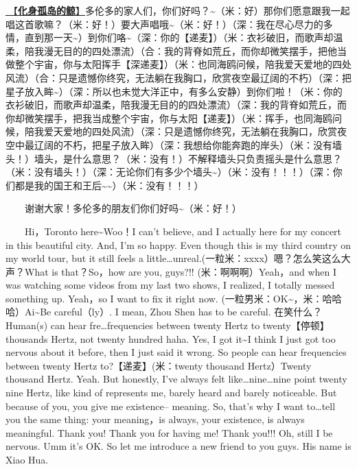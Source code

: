 \documentclass[]{ctexbook}
\begin{document}
\hyperref[hua-shen-gu-dao-de-jing]{🎵【\textbf{化身孤岛的鲸}】}多伦多的家人们，你们好吗？\textasciitilde（米：好）那你们愿意跟我一起唱这首歌嘛？（米：好！）要大声唱哦\textasciitilde（米：好！）（深：我在尽心尽力的多情，直到那一天\textasciitilde）到你们咯\textasciitilde（深：你的【递麦】）（米：衣衫破旧，而歌声却温柔，陪我漫无目的的四处漂流）（合：我的背脊如荒丘，而你却微笑摆手，把他当做整个宇宙，你与太阳挥手【深递麦】）（米：也同海鸥问候，陪我爱天爱地的四处风流）（合：只是遗憾你终究，无法躺在我胸口，欣赏夜空最辽阔的不朽）（深：把星子放入眸\textasciitilde）（深：所以也未觉大洋正中，有多么安静）到你们啦！（米：你的衣衫破旧，而歌声却温柔，陪我漫无目的的四处漂流）（深：我的背脊如荒丘，而你却微笑摆手，把我当成整个宇宙，你与太阳【递麦】）（米：挥手，也同海鸥问候，陪我爱天爱地的四处风流）（深：只是遗憾你终究，无法躺在我胸口，欣赏夜空中最辽阔的不朽，把星子放入眸）（深：我想给你能奔跑的岸头）（米：没有墙头！）墙头，是什么意思？（米：没有！）不解释墙头只负责摇头是什么意思？（米：没有墙头！）（深：无论你们有多少个墙头\textasciitilde）（米：没有！！！）（深：你们都是我的国王和王后\textasciitilde\textasciitilde）（米：没有！！！）

  谢谢大家！多伦多的朋友们你们好吗\textasciitilde（米：好！）

  Hi，Toronto here\textasciitilde Woo！I can't believe, and I actually here for my concert in this beautiful city. And, I'm so happy. Even though this is my third country on my world tour, but it still feels a little\ldots unreal.(一粒米：xxxx）嗯？怎么笑这么大声？What is that？So，how are you, guys?!! (米：啊啊啊）Yeah，and when I was watching
some videos from my last two shows, I realized, I totally messed something up. Yeah，so I want to fix it right now. (一粒男米：OK\textasciitilde，米：哈哈哈）Ai\textasciitilde Be careful（ly）. I mean, Zhou Shen has to be careful. 在笑什么？Human(s) can hear fre\ldots frequencies between twenty Hertz to twenty【停顿】thousands Hertz, not twenty hundred haha. Yes, I got it\textasciitilde I think I just got too nervous about it before, then I just said it wrong. So people can hear frequencies between twenty Hertz to?【递麦】(米：twenty thousand Hertz）Twenty thousand Hertz. Yeah. But honestly, I've always felt like\ldots nine\ldots nine point twenty nine Hertz, like kind of represents me, barely heard and barely noticeable. But because of you, you give me existence-- meaning. So, that's why I want to\ldots tell you the same thing: your meaning，is always, your existence, is always meaningful. Thank you! Thank you for having me! Thank you!!! Oh, still I be nervous. Umm it's OK. So let me introduce a new friend to you guys. His name is Xiao Hua.
\end{document}
